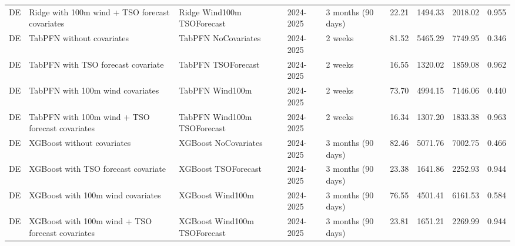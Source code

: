 \begin{longtable}{lllllllll}
DE & Ridge with 100m wind + TSO forecast covariates & Ridge Wind100m TSOForecast & 2024-2025 & 3 months (90 days) & 22.21 & 1494.33 & 2018.02 & 0.955 \\
DE & TabPFN without covariates & TabPFN NoCovariates & 2024-2025 & 2 weeks & 81.52 & 5465.29 & 7749.95 & 0.346 \\
DE & TabPFN with TSO forecast covariate & TabPFN TSOForecast & 2024-2025 & 2 weeks & 16.55 & 1320.02 & 1859.08 & 0.962 \\
DE & TabPFN with 100m wind covariates & TabPFN Wind100m & 2024-2025 & 2 weeks & 73.70 & 4994.15 & 7146.06 & 0.440 \\
DE & TabPFN with 100m wind + TSO forecast covariates & TabPFN Wind100m TSOForecast & 2024-2025 & 2 weeks & 16.34 & 1307.20 & 1833.38 & 0.963 \\
DE & XGBoost without covariates & XGBoost NoCovariates & 2024-2025 & 3 months (90 days) & 82.46 & 5071.76 & 7002.75 & 0.466 \\
DE & XGBoost with TSO forecast covariate & XGBoost TSOForecast & 2024-2025 & 3 months (90 days) & 23.38 & 1641.86 & 2252.93 & 0.944 \\
DE & XGBoost with 100m wind covariates & XGBoost Wind100m & 2024-2025 & 3 months (90 days) & 76.55 & 4501.41 & 6161.53 & 0.584 \\
DE & XGBoost with 100m wind + TSO forecast covariates & XGBoost Wind100m TSOForecast & 2024-2025 & 3 months (90 days) & 23.81 & 1651.21 & 2269.99 & 0.944 \\
\end{longtable}
